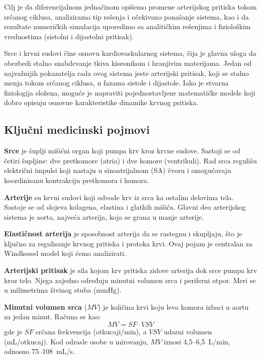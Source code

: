 \documentclass[12pt,a4paper]{article}
\begin{document}
Cilj je da diferencijalnom jednačinom opišemo promene arterijskog pritiska tokom srčanog ciklusa, analiziramo tip rešenja i očekivano ponašanje sistema, kao i da rezultate numeričkih simulacija uporedimo sa analitičkim rešenjima i fiziološkim vrednostima (sistolni i dijastolni pritisak).

Srce i krvni sudovi čine osnovu kardiovaskularnog sistema, čija je glavna uloga da obezbedi stalno snabdevanje tkiva kiseonikom i hranjivim materijama. Jedan od najvažnijih pokazatelja rada ovog sistema jeste arterijski pritisak, koji se stalno menja tokom srčanog ciklusa, u fazama sistole i dijastole. Iako je stvarna fiziologija složena, moguće je napraviti pojednostavljene matematičke modele koji dobro opisuju osnovne karakteristike dinamike krvnog pritiska.

\subsection{Ključni medicinski pojmovi}

\textbf{Srce} je šuplji mišićni organ koji pumpa krv kroz krvne sudove. Sastoji se od četiri šupljine: dve pretkomore (atria) i dve komore (ventrikuli). Rad srca regulišu električni impulsi koji nastaju u sinoatrijalnom (SA) čvoru i omogućavaju koordinisanu kontrakciju pretkomora i komora.


\textbf{Arterije} su krvni sudovi koji odvode krv iz srca ka ostalim delovima tela. Sastoje se od slojeva kolagena, elastina i glatkih mišića. Glavni deo arterijskog sistema je aorta, najveća arterija, koja se grana u manje arterije.

\textbf{Elastičnost arterija} je sposobnost arterija da se rastegnu i skupljaju, što je ključno za regulisanje krvnog pritiska i protoka krvi. Ovaj pojam je centralan za Windkessel model koji ćemo analizirati.

\textbf{Arterijski pritisak} je sila kojom krv pritiska zidove arterija dok srce pumpa krv kroz telo. Njega zajedno određuju minutni volumen srca i periferni otpor. Meri se u milimetrima živinog stuba (mmHg).

\textbf{Minutni volumen srca} ($MV$) je količina krvi koju leva komora izbaci u aortu za jedan minut. Računa se kao:
\begin{equation}
    MV = SF \cdot VSV
\end{equation}
gde je $SF$ srčana frekvencija (otkucaji/min), a $VSV$ udarni volumen (mL/otkucaj). Kod odrasle osobe u mirovanju, $MV$ iznosi 4,5--6,5~L/min, odnosno 75--108~mL/s.
\end{document}

